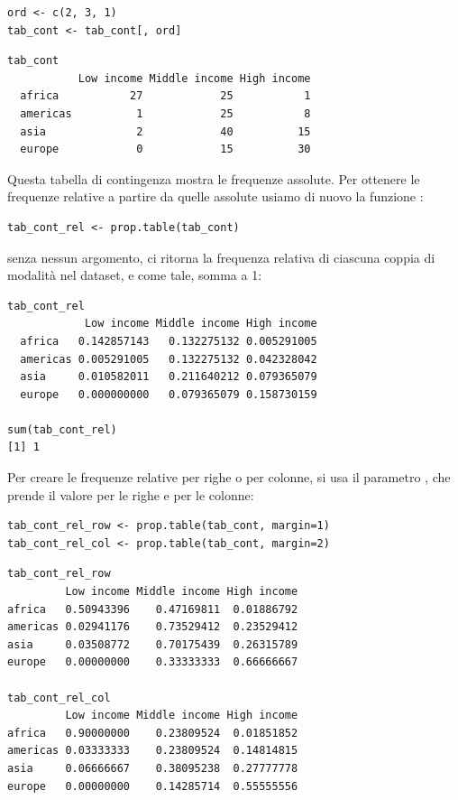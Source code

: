 \begin{lstlisting}[style=Rstylescript]
ord <- c(2, 3, 1) 
tab_cont <- tab_cont[, ord]
\end{lstlisting}

\begin{lstlisting}[style=Rstyle]
tab_cont
           Low income Middle income High income
  africa           27            25           1
  americas          1            25           8
  asia              2            40          15
  europe            0            15          30
\end{lstlisting}
%
Questa tabella di contingenza mostra le frequenze assolute. Per ottenere le frequenze relative a partire da quelle assolute usiamo di nuovo la funzione :

\begin{lstlisting}[style=Rstylescript]
tab_cont_rel <- prop.table(tab_cont)
\end{lstlisting}
%
senza nessun argomento, ci ritorna la frequenza relativa di ciascuna coppia di modalit\`a nel dataset, e come tale, somma a 1:


\begin{lstlisting}[style=Rstyle]
tab_cont_rel
            Low income Middle income High income
  africa   0.142857143   0.132275132 0.005291005
  americas 0.005291005   0.132275132 0.042328042
  asia     0.010582011   0.211640212 0.079365079
  europe   0.000000000   0.079365079 0.158730159
  
sum(tab_cont_rel)
[1] 1
\end{lstlisting}
%
Per creare le frequenze relative per righe o per colonne, si usa il parametro , che prende il valore  per le righe e  per le colonne:

\begin{lstlisting}[style=Rstylescript]
tab_cont_rel_row <- prop.table(tab_cont, margin=1)
tab_cont_rel_col <- prop.table(tab_cont, margin=2)
\end{lstlisting}


\begin{lstlisting}[style=Rstyle]
tab_cont_rel_row
         Low income Middle income High income
africa   0.50943396    0.47169811  0.01886792
americas 0.02941176    0.73529412  0.23529412
asia     0.03508772    0.70175439  0.26315789
europe   0.00000000    0.33333333  0.66666667

tab_cont_rel_col
         Low income Middle income High income
africa   0.90000000    0.23809524  0.01851852
americas 0.03333333    0.23809524  0.14814815
asia     0.06666667    0.38095238  0.27777778
europe   0.00000000    0.14285714  0.55555556
\end{lstlisting}


